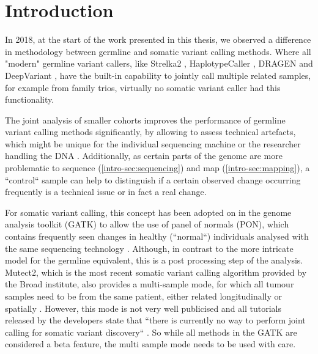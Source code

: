 \section{Introduction}
\label{variantcalling-sec:intro}
In 2018, at the start of the work presented in this thesis, we observed a difference in methodology  between germline and somatic variant calling methods. Where all "modern" germline variant callers, like Strelka2 \cite{Kim2018}, HaplotypeCaller \cite{Poplin2017}, DRAGEN \cite{Miller2015} and DeepVariant \cite{Poplin2018},  have the built-in capability to jointly call multiple related samples, for example from family trios, virtually no somatic variant caller had this functionality. 

The joint analysis of smaller cohorts improves the performance of germline variant calling methods significantly, by allowing to assess technical artefacts, which might be unique for the individual sequencing machine or the researcher handling the DNA \cite{Schirmer2016,Stoler2021}. Additionally, as certain parts of the genome are more problematic to sequence (\autoref{intro-sec:sequencing}) and map (\autoref{intro-sec:mapping}), a ``control`` sample can help to distinguish if a certain observed change occurring frequently is a technical issue or in fact a real change.

For somatic variant calling, this concept has been adopted on in the genome analysis toolkit (GATK) \cite{BrianOConnor2020} to allow the use of panel of normals (PON), which contains frequently seen changes in healthy (``normal``) individuals analysed with the same sequencing technology \cite{GATKTeam2021}. Although, in contrast to the  more intricate model for the germline equivalent, this is a post processing step of the analysis. Mutect2, which is the most recent somatic variant calling algorithm provided by the Broad institute, also provides a multi-sample mode, for which all tumour samples need to be from the same patient, either related longitudinally or spatially \cite{GATKTeam2020}. However, this mode is not very well publicised and all tutorials released by the developers state that ``there is currently no way to perform joint calling for somatic variant discovery`` \cite{GATKTeam2021a}. So while all methods in the GATK are considered a beta feature, the multi sample mode needs to be used with care.


